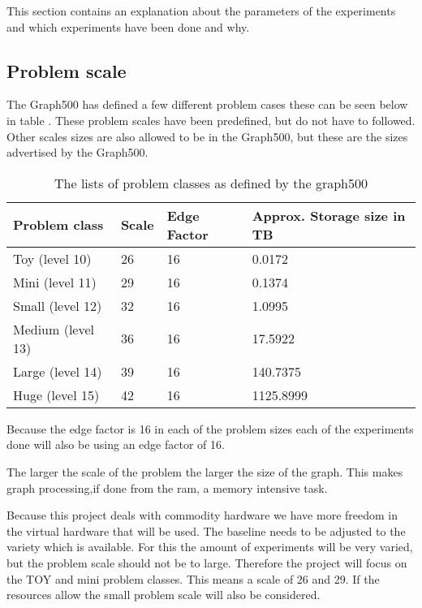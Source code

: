This section contains an explanation about the parameters of the experiments and which experiments have been done and why.

\subsection{Problem scale}
The Graph500 has defined a few different problem cases these can be seen below in table \cite{tab:problem_scales}. These problem scales have been predefined, but do not have to followed. Other scales sizes are also allowed to be in the Graph500, but these are the sizes advertised by the Graph500.
\begin{table}[H]
\begin{tabular}{|l|l|l|l|}
\hline
Problem class & Scale & Edge Factor & Approx. Storage size in TB\\ \hline
Toy (level 10) &	26 &	16 &	0.0172\\ \hline
Mini (level 11) &	29 &	16 &	0.1374\\ \hline
Small (level 12) &	32 &	16 &	1.0995\\ \hline
Medium (level 13)& 	36 &	16 &	17.5922\\ \hline
Large (level 14) &	39 &	16 &	140.7375\\ \hline
Huge (level 15) &	42 &	16 &	1125.8999\\ \hline
\end{tabular}
\label{tab:problem_scales}
\caption{The lists of problem classes as defined by the graph500}
\end{table}

Because the edge factor is 16 in each of the problem sizes each of the experiments done will also be using an edge factor of 16. 

The larger the scale of the problem the larger the size of the graph. This makes graph processing,if done from the ram, a memory intensive task. 

Because this project deals with commodity hardware we have more freedom in the virtual hardware that will be used. The baseline needs to be adjusted to the variety which is available. For this the amount of experiments will be very varied, but the problem scale should not be to large. Therefore the project will focus on the TOY and mini problem classes. This means a scale of 26 and 29. If the resources allow the small problem scale will also be considered.


